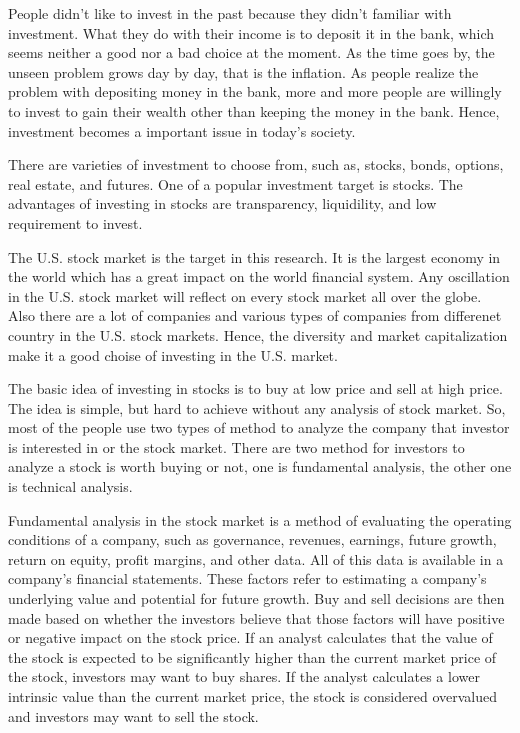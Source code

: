 \documentclass[../main.tex]{subfiles}
\begin{document}

People didn't like to invest in the past because they didn't familiar with investment. What they do with their income is to deposit it in the bank, which seems neither a good nor a bad choice at the moment. As the time goes by, the unseen problem grows day by day, that is the inflation. As people realize the problem with depositing money in the bank, more and more people are willingly to invest to gain their wealth other than keeping the money in the bank. Hence, investment becomes a important issue in today's society.

\bigbreak

There are varieties of investment to choose from, such as, stocks, bonds, options, real estate, and futures. One of a popular investment target is stocks. The advantages of investing in stocks are transparency, liquidility, and low requirement to invest.

\bigbreak

The U.S. stock market is the target in this research. It is the largest economy in the world which has a great impact on the world financial system. Any oscillation in the U.S. stock market will reflect on every stock market all over the globe. Also there are a lot of companies and various types of companies from differenet country in the U.S. stock markets. Hence, the diversity and market capitalization make it a good choise of investing in the U.S. market.

\bigbreak

The basic idea of investing in stocks is to buy at low price and sell at high price. The idea is simple, but hard to achieve without any analysis of stock market. So, most of the people use two types of method to analyze the company that investor is interested in or the stock market. There are two method for investors to analyze a stock is worth buying or not, one is fundamental analysis, the other one is technical analysis.

\bigbreak

Fundamental analysis in the stock market is a method of evaluating the operating conditions of a company, such as governance, revenues, earnings, future growth, return on equity, profit margins, and other data. All of this data is available in a company's financial statements. These factors refer to estimating a company's underlying value and potential for future growth. Buy and sell decisions are then made based on whether the investors believe that those factors will have positive or negative impact on the stock price. If an analyst calculates that the value of the stock is expected to be significantly higher than the current market price of the stock, investors may want to buy shares. If the analyst calculates a lower intrinsic value than the current market price, the stock is considered overvalued and investors may want to sell the stock.
\end{document}
